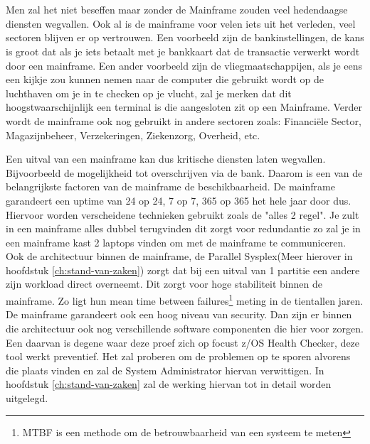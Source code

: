 
\chapter{}
\label{ch:inleiding}

Men zal het niet beseffen maar zonder de Mainframe zouden veel hedendaagse diensten wegvallen. Ook al is de mainframe voor velen iets uit het verleden, veel sectoren blijven er op vertrouwen. Een voorbeeld zijn de bankinstellingen, de kans is groot dat als je iets betaalt met je bankkaart dat de transactie verwerkt wordt door een mainframe. Een ander voorbeeld zijn de vliegmaatschappijen, als je eens een kijkje zou kunnen nemen naar de computer die gebruikt wordt op de luchthaven om je in te checken op je vlucht, zal je merken dat dit hoogstwaarschijnlijk een terminal is die aangesloten zit op een Mainframe. Verder wordt de mainframe ook nog gebruikt in andere sectoren zoals: Financiële Sector, Magazijnbeheer, Verzekeringen, Ziekenzorg, Overheid, etc.

Een uitval van een mainframe kan dus kritische diensten laten wegvallen. Bijvoorbeeld de mogelijkheid tot overschrijven via de bank. Daarom is een van de belangrijkste factoren van de mainframe de beschikbaarheid. De mainframe garandeert een uptime van 24 op 24, 7 op 7, 365 op 365 het hele jaar door dus. Hiervoor worden verscheidene technieken gebruikt zoals de "alles 2 regel". Je zult in een mainframe alles dubbel terugvinden dit zorgt voor redundantie zo zal je in een mainframe kast 2 laptops vinden om met de mainframe te communiceren. Ook de architectuur binnen de mainframe, de Parallel Sysplex(Meer hierover in hoofdstuk \ref{ch:stand-van-zaken}) zorgt dat bij een uitval van 1 partitie een andere zijn workload direct overneemt. Dit zorgt voor hoge stabiliteit binnen de mainframe. Zo ligt hun mean time between failures\footnote{MTBF is een methode om de betrouwbaarheid van een systeem te meten} meting in de tientallen jaren. De mainframe garandeert ook een hoog niveau van security. Dan zijn er binnen die architectuur ook nog verschillende software componenten die hier voor zorgen. Een daarvan is degene waar deze proef zich op focust z/OS Health Checker, deze tool werkt preventief. Het zal proberen om de problemen op te sporen alvorens die plaats vinden en zal de System Administrator hiervan verwittigen. In hoofdstuk \ref{ch:stand-van-zaken} zal de werking hiervan tot in detail worden uitgelegd.

